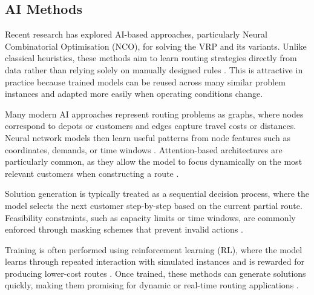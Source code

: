 \subsection{AI Methods} 

Recent research has explored AI-based approaches, particularly Neural
Combinatorial Optimisation (NCO), for solving the VRP and its variants. Unlike
classical heuristics, these methods aim to learn routing strategies directly
from data rather than relying solely on manually designed rules
\cite{nazariReinforcementLearningSolving2018, Kool2019, RouteFinder}. This is
attractive in practice because trained models can be reused across many similar
problem instances and adapted more easily when operating conditions change.

Many modern AI approaches represent routing problems as graphs, where nodes
correspond to depots or customers and edges capture travel costs or distances.
Neural network models then learn useful patterns from node features such as
coordinates, demands, or time windows
\cite{nazariReinforcementLearningSolving2018, Kool2019}. Attention-based
architectures are particularly common, as they allow the model to focus
dynamically on the most relevant customers when constructing a route
\cite{Kool2019}.

Solution generation is typically treated as a sequential decision process, where
the model selects the next customer step-by-step based on the current partial
route. Feasibility constraints, such as capacity limits or time windows, are
commonly enforced through masking schemes that prevent invalid actions
\cite{nazariReinforcementLearningSolving2018, Kool2019}.

Training is often performed using reinforcement learning (RL), where the model
learns through repeated interaction with simulated instances and is rewarded for
producing lower-cost routes \cite{nazariReinforcementLearningSolving2018,
Kool2019, Hottung2020}. Once trained, these methods can generate solutions
quickly, making them promising for dynamic or real-time routing applications
\cite{shahbazianKnowledgeguidedHybridDeep2025, RouteFinder}.
